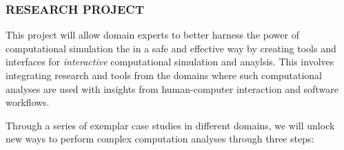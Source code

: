 \documentclass[a4paper,fontsize=12pt]{scrartcl}
\begin{document}
\subsubsection*{RESEARCH PROJECT}








This project will allow domain experts to better harness the power of
computational simulation the in a safe and effective way by creating
tools and interfaces for \emph{interactive} computational simulation
and anaylsis. This involves integrating research and tools from the
domains where such computational analyses are used with insights from
human-computer interaction and software workflows.

Through a series of exemplar case studies in different domains, we
will unlock new ways to perform complex computation analyses through
three steps:
\end{document}
